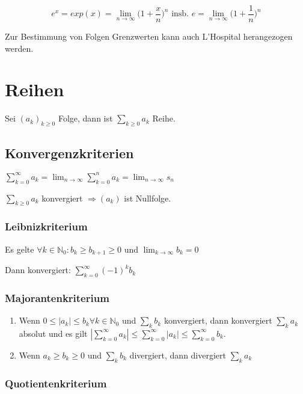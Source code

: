 $$e^x = exp(x) = \lim_{n\to \infty} \Big(1 + \frac{x}{n}\Big)^n \text{ insb. } e = \lim_{n\to \infty} \Big(1 + \frac{1}{n}\Big)^n$$

Zur Bestimmung von Folgen Grenzwerten kann auch L'Hospital herangezogen werden.

\section*{Reihen}

Sei $(a_k)_{k\geq 0}$ Folge, dann ist $\sum_{k\geq 0} a_k$ Reihe.

\subsection*{Konvergenzkriterien}

$\sum_{k=0}^\infty a_k = \lim_{n\to \infty} \sum_{k=0}^n a_k = \lim_{n\to \infty} s_n$

$\sum_{k\geq 0} a_k$ konvergiert $\Rightarrow (a_k)$ ist Nullfolge.

\subsubsection*{Leibnizkriterium}

Es gelte $\forall k \in \mathbb{N}_0 : b_k \geq b_{k+1} \geq 0$ und $\displaystyle \lim_{k \to \infty} b_k = 0$

Dann konvergiert: $\sum_{k=0}^\infty (-1)^k b_k$

\subsubsection*{Majorantenkriterium}

\begin{enumerate}[label=(\alph*)]
	\item Wenn $0 \leq |a_k| \leq b_k \forall k \in \mathbb{N}_0$ und $\sum_k b_k$ konvergiert, dann konvergiert $\sum_k a_k$ absolut und es gilt $|\sum_{k=0}^\infty a_k| \leq \sum_{k=0}^\infty |a_k| \leq \sum_{k=0}^\infty b_k$.
	\item Wenn $a_k \geq b_k \geq 0$ und $\sum_k b_k$ divergiert, dann divergiert $\sum_k a_k$
\end{enumerate}

\subsubsection*{Quotientenkriterium}

